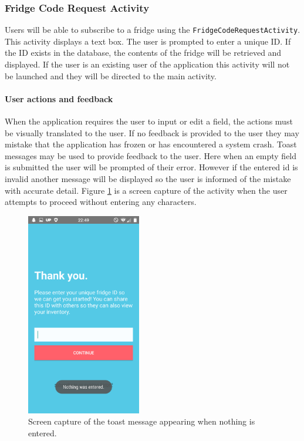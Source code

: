 \documentclass[a4paper, 11pt]{article}
\begin{document}
\vspace{\baselineskip}

\subsubsection{Fridge Code Request Activity}
Users will be able to subscribe to a fridge using the \texttt{FridgeCodeRequestActivity}. This activity displays a text box. The user is prompted to enter a unique ID. If the ID exists in the database, the contents of the fridge will be retrieved and displayed. If the user is an existing user of the application this activity will not be launched and they will be directed to the main activity.

\paragraph{User actions and feedback}
When the application requires the user to input or edit a field, the actions must be visually translated to the user. If no feedback is provided to the user they may mistake that the application has frozen or has encountered a system crash. Toast messages may be used to provide feedback to the user. Here when an empty field is submitted the user will be prompted of their error. However if the entered id is invalid another message will be displayed so the user is informed of the mistake with accurate detail. Figure \ref{fig:toast} is a screen capture of the activity when the user attempts to proceed without entering any characters. 

\vspace{\baselineskip}

\begin{figure}[!htbp]
\centering
\includegraphics[width=5cm]{toast}
\caption{Screen capture of the toast message appearing when nothing is entered.} \label{fig:toast}
\end{figure}
\end{document}

